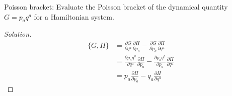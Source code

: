 
\begin{problem}
Poisson bracket: Evaluate the Poisson bracket of the dynamical quantity
$G = p_aq^a$ for a Hamiltonian system.
\end{problem}
\begin{proof}[Solution]
	\begin{align*}
		\{G, H\}
		&=\frac{\partial G}{\partial q^a} \frac{\partial H}{\partial p_a}-\frac{\partial G}{\partial p_a} \frac{\partial H}{\partial q^a}\\
		&=\frac{\partial p_a q^a}{\partial q^a} \frac{\partial H}{\partial p_a}-\frac{\partial p_aq^a}{\partial p_a} \frac{\partial H}{\partial q^a}\\
		&=p_a \frac{\partial H}{\partial p_a}-q_a \frac{\partial H}{\partial q^a}
\end{align*}
\end{proof}

